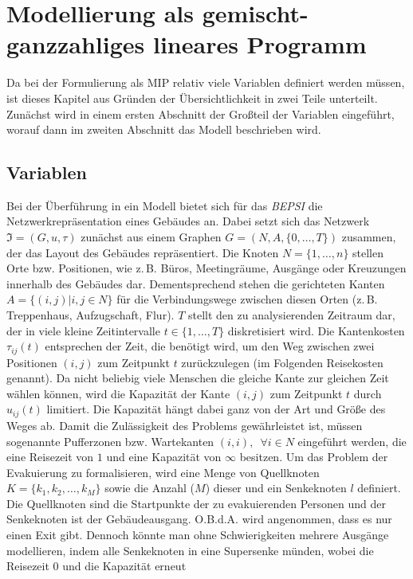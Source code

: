 \documentclass[a4paper, 11pt]{scrreprt}
\begin{document}
\chapter{Modellierung als gemischt-ganzzahliges lineares Programm}
Da bei der Formulierung als MIP relativ viele Variablen definiert werden müssen, ist
dieses Kapitel aus Gründen der Übersichtlichkeit in zwei Teile unterteilt.
Zunächst wird in einem ersten Abschnitt der Großteil der Variablen eingeführt,
worauf dann im zweiten Abschnitt das Modell beschrieben wird.

\section{Variablen}
Bei der Überführung in ein Modell bietet sich für das \textit{BEPSI} die
Netzwerkrepräsentation eines Gebäudes an.
Dabei setzt sich das Netzwerk $\Im = (G,u,\tau)$ zunächst aus einem Graphen
$G = (N,A,\{0,…,T\})$ zusammen, der das Layout des Gebäudes repräsentiert.
Die Knoten $N = \{1, \dots, n\}$ stellen Orte bzw. Positionen, wie z.\,B. Büros, Meetingräume,
Ausgänge oder Kreuzungen innerhalb des Gebäudes dar. Dementsprechend stehen
die gerichteten Kanten $A = \{(i,j) | i,j \in N\}$ für die Verbindungswege zwischen diesen
Orten (z.\,B. Treppenhaus, Aufzugschaft, Flur). $T$ stellt den zu analysierenden
Zeitraum dar, der in viele kleine Zeitintervalle $t \in \{1, \dots, T\}$ diskretisiert wird.
Die Kantenkosten $\tau_{ij}(t)$ entsprechen der Zeit, die benötigt wird,
um den Weg zwischen zwei Positionen $(i, j)$ zum Zeitpunkt $t$ zurückzulegen (im Folgenden Reisekosten genannt).
Da nicht beliebig viele Menschen die gleiche Kante zur gleichen Zeit wählen können,
wird die Kapazität der Kante $(i, j)$ zum Zeitpunkt $t$ durch $u_{ij}(t)$ limitiert. Die
Kapazität hängt dabei ganz von der Art und Größe des Weges ab.
Damit die Zulässigkeit des Problems gewährleistet ist, müssen sogenannte Pufferzonen bzw. Wartekanten
$(i,i), \,\,\, \forall i \in N$ eingeführt werden, die eine Reisezeit von $1$ und eine
Kapazität von $\infty$ besitzen.
Um das Problem der Evakuierung zu formalisieren, wird eine Menge von Quellknoten
$K = \{k_1, k_2,…,k_M\}$ sowie die Anzahl ($M$) dieser und ein Senkeknoten $l$ definiert.
Die Quellknoten sind die Startpunkte der zu evakuierenden Personen und der Senkeknoten ist der Gebäudeausgang.
O.B.d.A. wird angenommen, dass es nur einen Exit gibt. Dennoch könnte man ohne Schwierigkeiten mehrere Ausgänge
modellieren, indem alle Senkeknoten in eine Supersenke münden, wobei die Reisezeit $0$ und die Kapazität erneut
\end{document}
